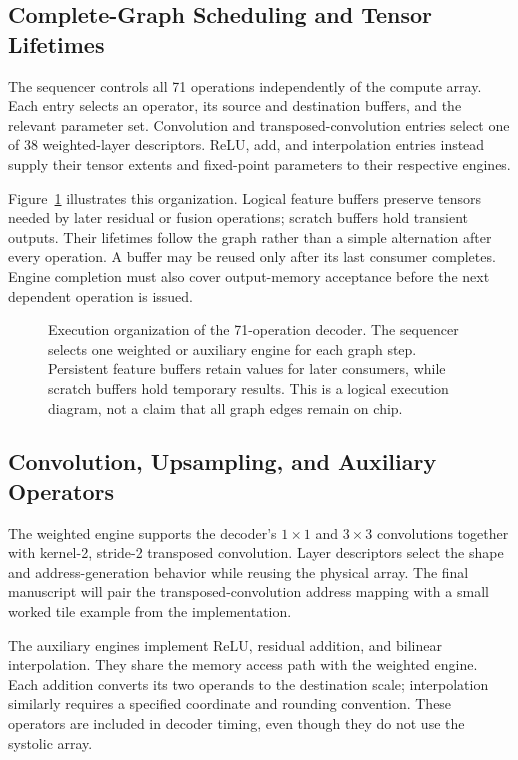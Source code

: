 \subsection{Complete-Graph Scheduling and Tensor Lifetimes}
\label{sec:graph-schedule}
The sequencer controls all 71 operations independently of the compute array.
Each entry selects an operator, its source and destination buffers, and the
relevant parameter set. Convolution and transposed-convolution entries select
one of 38 weighted-layer descriptors. ReLU, add, and interpolation entries
instead supply their tensor extents and fixed-point parameters to their
respective engines.

Figure~\ref{fig:graph-execution} illustrates this organization. Logical
feature buffers preserve tensors needed by later residual or fusion
operations; scratch buffers hold transient outputs. Their lifetimes follow
the graph rather than a simple alternation after every operation. A buffer
may be reused only after its last consumer completes. Engine completion must
also cover output-memory acceptance before the next dependent operation is
issued.

\begin{figure}[h]
  \centering
  
  \caption{Execution organization of the 71-operation decoder. The sequencer
  selects one weighted or auxiliary engine for each graph step. Persistent
  feature buffers retain values for later consumers, while scratch buffers
  hold temporary results. This is a logical execution diagram, not a claim
  that all graph edges remain on chip.}
  \label{fig:graph-execution}
\end{figure}

\subsection{Convolution, Upsampling, and Auxiliary Operators}
The weighted engine supports the decoder's $1\times1$ and $3\times3$
convolutions together with kernel-2, stride-2 transposed convolution. Layer
descriptors select the shape and address-generation behavior while reusing
the physical array. The final manuscript will pair the transposed-convolution
address mapping with a small worked tile example from the implementation.

The auxiliary engines implement ReLU, residual addition, and bilinear
interpolation. They share the memory access path with the weighted engine.
Each addition converts its two operands to the
destination scale; interpolation similarly requires a specified coordinate
and rounding convention. These operators are included in decoder timing,
even though they do not use the systolic array.

